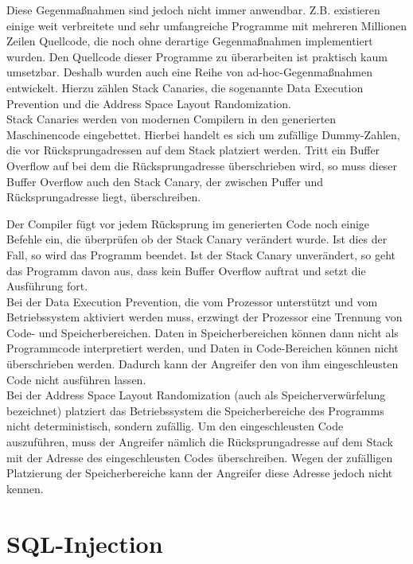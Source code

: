 Diese Gegenmaßnahmen sind jedoch nicht immer anwendbar.
Z.B. existieren einige weit verbreitete und sehr umfangreiche Programme mit mehreren Millionen Zeilen Quellcode, die noch ohne derartige Gegenmaßnahmen implementiert wurden.
Den Quellcode dieser Programme zu überarbeiten ist praktisch kaum umsetzbar.
Deshalb wurden auch eine Reihe von ad-hoc-Gegenmaßnahmen entwickelt.
Hierzu zählen Stack Canaries, die sogenannte Data Execution Prevention und die Address Space Layout Randomization.\\

Stack Canaries werden von modernen Compilern in den generierten Maschinencode eingebettet.
Hierbei handelt es sich um zufällige Dummy-Zahlen, die vor Rücksprungadressen auf dem Stack platziert werden.
Tritt ein Buffer Overflow auf bei dem die Rücksprungadresse überschrieben wird, so muss dieser Buffer Overflow auch den Stack Canary, der zwischen Puffer und Rücksprungadresse liegt, überschreiben.

Der Compiler fügt vor jedem Rücksprung im generierten Code noch einige Befehle ein, die überprüfen ob der Stack Canary verändert wurde.
Ist dies der Fall, so wird das Programm beendet.
Ist der Stack Canary unverändert, so geht das Programm davon aus, dass kein Buffer Overflow auftrat und setzt die Ausführung fort.\\

Bei der Data Execution Prevention, die vom Prozessor unterstützt und vom Betriebssystem aktiviert werden muss,
erzwingt der Prozessor eine Trennung von Code- und Speicherbereichen.
Daten in Speicherbereichen können dann nicht als Programmcode interpretiert werden, und Daten in Code-Bereichen können nicht überschrieben werden.
Dadurch kann der Angreifer den von ihm eingeschleusten Code nicht ausführen lassen.\\

Bei der Address Space Layout Randomization (auch als Speicherverwürfelung bezeichnet) platziert das Betriebssystem die Speicherbereiche des Programms nicht deterministisch, sondern zufällig.
Um den eingeschleusten Code auszuführen, muss der Angreifer nämlich die Rücksprungadresse auf dem Stack mit der Adresse des eingeschleusten Codes überschreiben.
Wegen der zufälligen Platzierung der Speicherbereiche kann der Angreifer diese Adresse jedoch nicht kennen.


\section{SQL-Injection}

